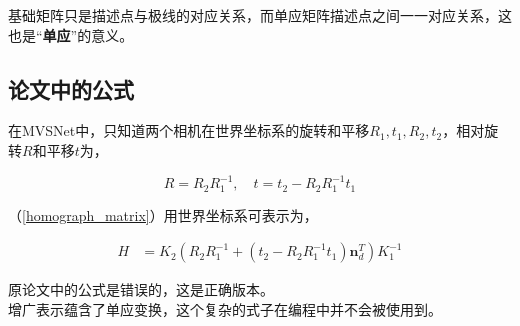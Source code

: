 	基础矩阵只是描述点与极线的对应关系，而单应矩阵描述点之间一一对应关系，这也是“\textbf{单应}”的意义。

	\subsection*{论文中的公式}

	在MVSNet中，只知道两个相机在世界坐标系的旋转和平移$R_1,t_1,R_2, t_2$，相对旋转$R$和平移$t$为，

	$$
		R = R_2R_1^{-1},\quad 
		t = t_2 - R_2R_1^{-1}t_1
	$$

	（\ref{homograph_matrix}）用世界坐标系可表示为，

	\begin{align}
		H &= K_2 \left(R_2R_1^{-1} +\left(t_2 - R_2R_1^{-1}t_1\right) \mathbf{n}_d^T\right) K_1^{-1} \label{new_homograph_matrix}
	\end{align}	

	原论文中的公式是错误的，这是正确版本。\\

	增广表示蕴含了单应变换，这个复杂的式子在编程中并不会被使用到。
